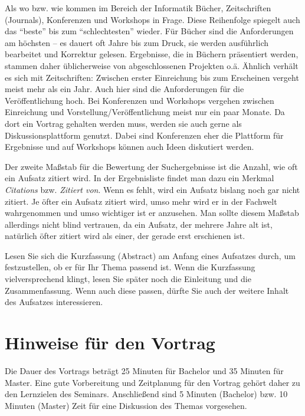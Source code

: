 \documentclass[final,bibliography=totocnumbered]{include/sikseminar}
\begin{document}
Als wo bzw. wie kommen im Bereich der Informatik Bücher, Zeitschriften (Journals), Konferenzen und Workshops in Frage. Diese Reihenfolge spiegelt auch das "`beste"' bis zum "`schlechtesten"' wieder. Für Bücher sind die Anforderungen am höchsten -- es dauert oft Jahre bis zum Druck, sie werden ausführlich bearbeitet und Korrektur gelesen. Ergebnisse, die in Büchern präsentiert werden, stammen daher üblicherweise von abgeschlossenen Projekten o.ä. Ähnlich verhält es sich mit Zeitschriften: Zwischen erster Einreichung bis zum Erscheinen vergeht meist mehr als ein Jahr. Auch hier sind die Anforderungen für die Veröffentlichung hoch. Bei Konferenzen und Workshops vergehen zwischen Einreichung und Vorstellung/Veröffentlichung meist nur ein paar Monate. Da dort ein Vortrag gehalten werden muss, werden sie auch gerne als Diskussionsplattform genutzt. Dabei sind Konferenzen eher die Plattform für Ergebnisse und auf Workshops können auch Ideen diskutiert werden.

Der zweite Maßstab für die Bewertung der Suchergebnisse ist die Anzahl, wie oft ein Aufsatz zitiert wird. In der Ergebnisliste findet man dazu ein Merkmal \textit{Citations} bzw. \textit{Zitiert von}. Wenn es fehlt, wird ein Aufsatz bislang noch gar nicht zitiert. Je öfter ein Aufsatz zitiert wird, umso mehr wird er in der Fachwelt wahrgenommen und umso wichtiger ist er anzusehen. Man sollte diesem Maßstab allerdings nicht blind vertrauen, da ein Aufsatz, der mehrere Jahre alt ist, natürlich öfter zitiert wird als einer, der gerade erst erschienen ist.

Lesen Sie sich die Kurzfassung (Abstract) am Anfang eines Aufsatzes durch, um festzustellen, ob er für Ihr Thema passend ist. Wenn die Kurzfassung vielversprechend klingt, lesen Sie später noch die Einleitung und die Zusammenfassung. Wenn auch diese passen, dürfte Sie auch der weitere Inhalt des Aufsatzes interessieren.


 


\section{Hinweise für den Vortrag}

Die Dauer des Vortrags beträgt 25 Minuten für Bachelor und 35 Minuten für Master. Eine gute Vorbereitung und Zeitplanung für den Vortrag gehört daher zu den Lernzielen des Seminars. Anschließend sind 5 Minuten (Bachelor) bzw. 10 Minuten (Master) Zeit für eine Diskussion des Themas vorgesehen.
\end{document}

